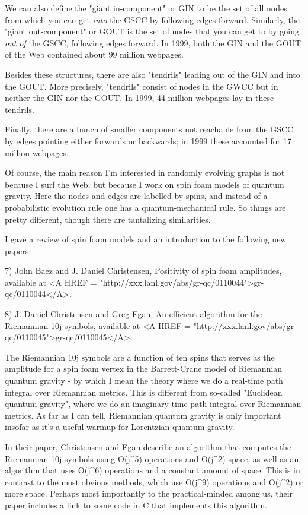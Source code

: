 We can also define the "giant in-component" or GIN to be the 
set of all
nodes from which you can get \emph{into} the GSCC by following edges forward.
Similarly, the "giant out-component" or GOUT is the set of nodes that
you can get to by going \emph{out of} the GSCC, following edges forward.  In
1999, both the GIN and the GOUT of the Web contained about 99 million
webpages.

Besides these structures, there are also "tendrils" 
leading out of the 
GIN and into the GOUT.  More precisely, "tendrils" consist of 
nodes in 
the GWCC but in neither the GIN nor the GOUT.  In 1999, 44 million
webpages lay in these tendrils.

Finally, there are a bunch of smaller components not reachable from the
GSCC by edges pointing either forwards or backwards; in 1999 these
accounted for 17 million webpages.

Of course, the main reason I'm interested in randomly evolving graphs is
not because I surf the Web, but because I work on spin foam models of
quantum gravity.  Here the nodes and edges are labelled by spins, and
instead of a probabilistic evolution rule one has a quantum-mechanical
rule.  So things are pretty different, though there are tantalizing
similarities.

I gave a review of spin foam models and an introduction to the following
new papers:

7) John Baez and J. Daniel Christensen, Positivity of spin foam
amplitudes, available at <A HREF = "http://xxx.lanl.gov/abs/gr-qc/0110044">gr-qc/0110044</A>.

8) J. Daniel Christensen and Greg Egan, An efficient algorithm for the 
Riemannian 10j symbols, available at <A HREF = "http://xxx.lanl.gov/abs/gr-qc/0110045">gr-qc/0110045</A>.

The Riemannian 10j symbols are a function of ten spins that serves as
the amplitude for a spin foam vertex in the Barrett-Crane model of
Riemannian quantum gravity - by which I mean the theory where we do a
real-time path integral over Riemannian metrics.  This is different from
so-called "Euclidean quantum gravity", where we do an
imaginary-time path integral over Riemannian metrics.  As far as I can
tell, Riemannian quantum gravity is only important insofar as it's a
useful warmup for Lorentzian quantum gravity.

In their paper, Christensen and Egan describe an algorithm that computes
the Riemannian 10j symbols using O(j^{5}) operations and
O(j^{2}) space, as well as an algorithm that uses O(j^{6})
operations and a constant amount of space.  This is in contrast to the
most obvious methods, which use O(j^{9}) operations and
O(j^{2}) or more space.  Perhaps most importantly to the
practical-minded among us, their paper includes a link to some code in C
that implements this algorithm.

